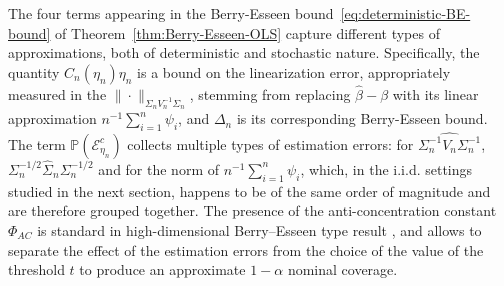 \documentclass[11pt]{article}
\begin{document}
The four terms appearing in the Berry-Esseen bound~\eqref{eq:deterministic-BE-bound} of Theorem~\ref{thm:Berry-Esseen-OLS} capture different types of approximations, both of deterministic and stochastic nature. Specifically, the quantity  $C_n(\eta_n)\eta_n$ is a bound on the linearization  error, appropriately measured in the $\| \cdot \|_{ \Sigma_n V^{-1}_n\Sigma_n }$, stemming from replacing $\widehat{\beta} - \beta$ with its  linear approximation $n^{-1}\sum_{i=1}^n \psi_i$, and  $\Delta_n$  is its corresponding Berry-Esseen bound. The term $\mathbb{P}(\mathcal{E}_{\eta_n}^c)$ collects multiple types of estimation errors: for $\widehat{\Sigma_n^{-1}V_n\Sigma_n^{-1}}$, $\Sigma_n^{-1/2}\widehat{\Sigma}_n\Sigma_n^{-1/2}$ and for the norm of $n^{-1} \sum_{i=1}^n \psi_i$, which, in the i.i.d. settings studied in the next section, happens to be of the same order of magnitude and are therefore grouped together. The presence of the anti-concentration constant $\Phi_{AC}$ is standard in high-dimensional Berry--Esseen type result \citep[see, e.g.][]{chernozhukov2017detailed}, and allows to separate the effect of the estimation errors from the choice of the value of the threshold $t$ to produce an approximate $1-\alpha$ nominal coverage. 
\end{document}

